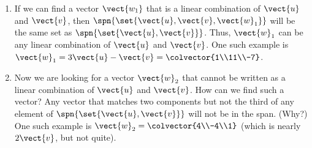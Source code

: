 \begin{enumerate}
%
\item
If we can find a vector $\vect{w_1}$ that is a linear combination of $\vect{u}$ and $\vect{v}$, then $\spn{\set{\vect{u}, \vect{v}, \vect{w}_1}}$ will be the same set as $\spn{\set{\vect{u}, \vect{v}}}$.  Thus, $\vect{w}_1$ can be any linear combination of $\vect{u}$ and $\vect{v}$.  One such example is
$\vect{w}_1 = 3\vect{u} - \vect{v} = \colvector{1\\11\\-7}$.
%
\item
Now we are looking for a vector $\vect{w}_2$ that cannot be written as a linear combination of $\vect{u}$ and $\vect{v}$. How can we find such a vector?  Any vector that matches two components but not the third of any element of $\spn{\set{\vect{u}, \vect{v}}}$ will not be in the span. (Why?)  One such example is
$\vect{w}_2 = \colvector{4\\-4\\1}$
(which is nearly $2\vect{v}$, but not quite).
%
\end{enumerate}